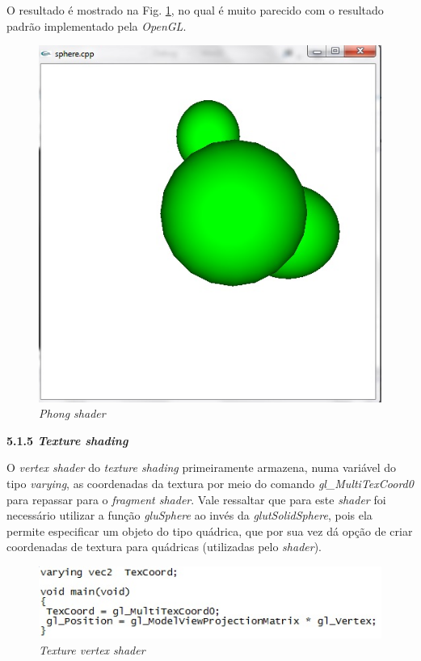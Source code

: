 \begin{description}
	O resultado é mostrado na  Fig. \ref{phong_shader}, no qual é muito parecido com o resultado padrão implementado pela  \textit{OpenGL}.

	\begin{figure}[h]
	\centering
		\includegraphics[keepaspectratio=true,scale=0.7]{figuras/phong_shader.jpg}
	\caption{\textit{Phong shader}}
	\label{phong_shader}
	\end{figure}

	\item \textbf{5.1.5 \textit{Texture shading}}

	O \textit{vertex shader} do \textit{texture shading} primeiramente armazena, numa variável do tipo \textit{varying}, as coordenadas da textura por meio do comando \textit{gl\_MultiTexCoord0} para repassar para o \textit{fragment shader}. Vale ressaltar que para este \textit{shader} foi necessário utilizar a função \textit{gluSphere} ao invés da \textit{glutSolidSphere}, pois ela permite especificar um objeto do tipo quádrica, que por sua vez dá opção de criar coordenadas de textura para quádricas (utilizadas pelo \textit{shader}).  

	\begin{figure}[h]
	\centering
		\includegraphics[keepaspectratio=true,scale=1.0]{figuras/texture_vs.jpg}
	\caption{\textit{Texture vertex shader}}
	\label{texture_vs}
	\end{figure}


\end{description}
